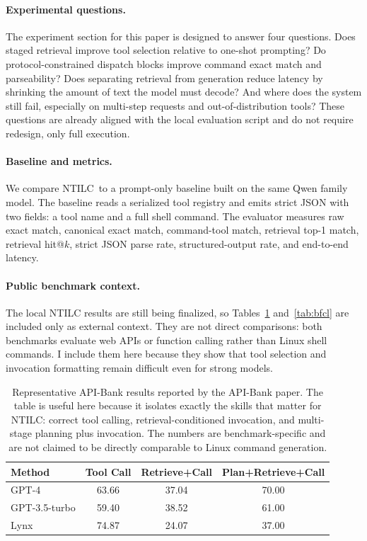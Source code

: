 \documentclass[10pt,twocolumn,letterpaper]{article}
\newcommand{\method}{NTILC}
\begin{document}
\paragraph{Experimental questions.}
The experiment section for this paper is designed to answer four questions. Does staged retrieval improve tool selection relative to one-shot prompting? Do protocol-constrained dispatch blocks improve command exact match and parseability? Does separating retrieval from generation reduce latency by shrinking the amount of text the model must decode? And where does the system still fail, especially on multi-step requests and out-of-distribution tools? These questions are already aligned with the local evaluation script and do not require redesign, only full execution.

\paragraph{Baseline and metrics.}
We compare \method\ to a prompt-only baseline built on the same Qwen family model. The baseline reads a serialized tool registry and emits strict JSON with two fields: a tool name and a full shell command. The evaluator measures raw exact match, canonical exact match, command-tool match, retrieval top-1 match, retrieval hit@$k$, strict JSON parse rate, structured-output rate, and end-to-end latency.

\paragraph{Public benchmark context.}
The local NTILC results are still being finalized, so Tables~\ref{tab:api-bank} and~\ref{tab:bfcl} are included only as external context. They are not direct comparisons: both benchmarks evaluate web APIs or function calling rather than Linux shell commands. I include them here because they show that tool selection and invocation formatting remain difficult even for strong models.

\begin{table}[t]
\centering
\small
\setlength{\tabcolsep}{8pt}
\begin{tabular}{lccc}
\toprule
Method & Tool Call & Retrieve+Call & Plan+Retrieve+Call \\
\midrule
GPT-4 & 63.66 & 37.04 & 70.00 \\
GPT-3.5-turbo & 59.40 & 38.52 & 61.00 \\
Lynx & 74.87 & 24.07 & 37.00 \\
\bottomrule
\end{tabular}
\caption{Representative API-Bank results reported by the API-Bank paper. The table is useful here because it isolates exactly the skills that matter for NTILC: correct tool calling, retrieval-conditioned invocation, and multi-stage planning plus invocation. The numbers are benchmark-specific and are not claimed to be directly comparable to Linux command generation.}
\label{tab:api-bank}
\end{table}
\end{document}
